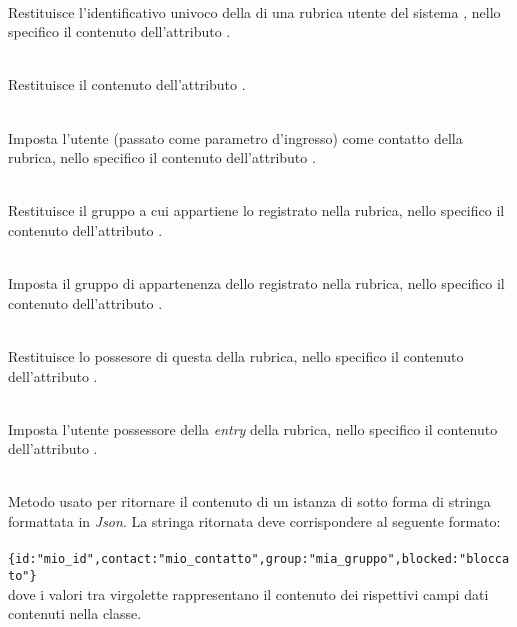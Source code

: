 \begin{description}
	\item{}\\
	Restituisce l'identificativo univoco della  di una rubrica utente del sistema \caName, nello specifico il contenuto dell'attributo .
	\item{}\\
	Restituisce il contenuto dell'attributo .
	\item{}\\
	Imposta l'utente  (passato come parametro d'ingresso) come contatto della rubrica, nello specifico il contenuto dell'attributo .
	\item{}\\
	Restituisce il gruppo a cui appartiene lo  registrato nella rubrica, nello specifico il contenuto dell'attributo .
	\item{}\\
	Imposta il gruppo di appartenenza dello  registrato nella rubrica, nello specifico il contenuto dell'attributo .
	\item{}\\
	Restituisce lo  possesore di questa  della rubrica, nello specifico il contenuto dell'attributo .
	\item{}\\
	Imposta l'utente  possessore della \textit{entry} della rubrica, nello specifico il contenuto dell'attributo .
	\item{}\\
	Metodo usato per ritornare il contenuto di un istanza di  sotto forma di stringa formattata in \textit{Json}. La stringa ritornata deve corrispondere al seguente formato:\\\\
	\verb|{id:"mio_id",contact:"mio_contatto",group:"mia_gruppo",blocked:"bloccato"}|\\
	
	dove i valori tra virgolette rappresentano il contenuto dei rispettivi campi dati contenuti nella classe.

\end{description}

